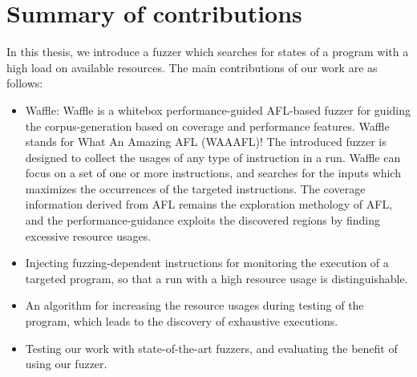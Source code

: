 \section{Summary of contributions}
\label{sec:1.2}

In this thesis, we introduce a fuzzer which searches for states of a program with a high load on available resources. The main contributions of our work are as follows:

\begin{itemize}
    \item Waffle: Waffle is a whitebox performance-guided AFL-based fuzzer for guiding the corpus-generation based on coverage and performance features. Waffle stands for What An Amazing AFL (WAAAFL)! The introduced fuzzer is designed to collect the usages of any type of instruction in a run. Waffle can focus on a set of one or more instructions, and searches for the inputs which maximizes the occurrences of the targeted instructions. The coverage information derived from AFL remains the exploration methology of AFL, and the performance-guidance exploits the discovered regions by finding excessive resource usages.
    \item Injecting fuzzing-dependent instructions for monitoring the execution of a targeted program, so that a run with a high resource usage is distinguishable.
    \item An algorithm for increasing the resource usages during testing of the program, which leads to the discovery of exhaustive executions.
    \item Testing our work with state-of-the-art fuzzers, and evaluating the benefit of using our fuzzer. 
\end{itemize}